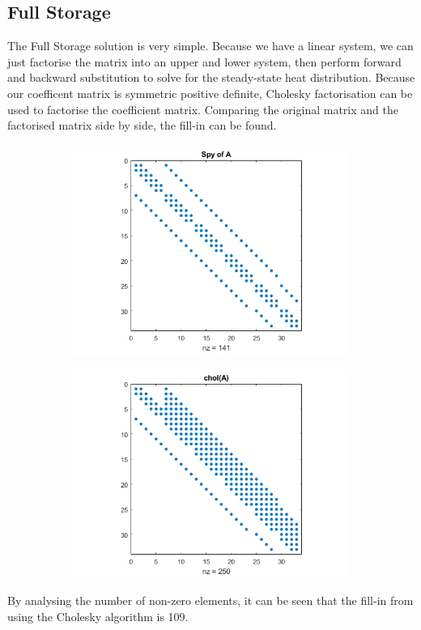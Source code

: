 \documentclass[12pt,a4paper]{article}
\begin{document}
\subsection{Full Storage}
The Full Storage solution is very simple. Because we have a linear system, we can just factorise the matrix into an upper and lower system, then perform forward and backward substitution to solve for the steady-state heat distribution. Because our coefficent matrix is symmetric positive definite, Cholesky factorisation can be used to factorise the coefficient matrix. Comparing the original matrix and the factorised matrix side by side, the fill-in can be found.
\begin{figure}[H]
	\hspace{-8mm}
	\begin{subfigure}[b]{0.6\textwidth}
		\hspace{-8mm}
		\includegraphics[width=\textwidth]{images/spyA.png}
	\end{subfigure}
	\hspace{-8mm}
	\begin{subfigure}[b]{0.6\textwidth}
		\hspace{-8mm}
		\includegraphics[width=\textwidth]{images/cholA.png}
	\end{subfigure}
\end{figure}
By analysing the number of non-zero elements, it can be seen that the fill-in from using the Cholesky algorithm is 109.
\end{document}

